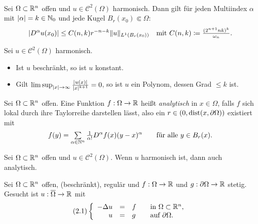 \documentclass{cheat-sheet}
\newcommand{\dist}{\mathrm{dist}} %
\begin{document}
\begin{satz}\mbox{}\\
  Sei $\Omega \subset \mathbb{R}^n$ offen und $u \in \mathcal{C}^2(\Omega)$ harmonisch. Dann gilt für jeden Multiindex $\alpha$ mit $\lvert\alpha\rvert = k \in \mathbb{N}_0$ und jede Kugel $B_r(x_0) \Subset \Omega$:
  \[
    \lvert D^\alpha u(x_0)\rvert \leq C(n, k) r^{-n-k} \lVert u\rVert_{L^1(B_r(x_0))}
    \quad \text{mit } C(n, k) \coloneqq \tfrac{(2^{n+1} nk)^k}{\omega_n}.
  \]
\end{satz}

\begin{satz}[Liouville]
  Sei $u \in \mathcal{C}^2(\Omega)$ harmonisch.
  \begin{itemize}
    \item Ist $u$ beschränkt, so ist $u$ konstant.
    \item Gilt $\limsup_{\lvert x\rvert \to \infty} \tfrac{\lvert u(x)\rvert}{\lvert x\rvert^{k+1}} = 0$, so ist $u$ ein Polynom, dessen Grad $\leq k$ ist.
  \end{itemize}
\end{satz}

\begin{defn}
  Sei $\Omega \subset \mathbb{R}^n$ offen. Eine Funktion $f : \Omega \to \mathbb{R}$ heißt \emph{analytisch} in $x \in \Omega$, falls $f$ sich lokal durch ihre Taylorreihe darstellen lässt, also ein $r \in \ointerval{0}{\dist(x, \partial \Omega)}$ existiert mit
  \[
    f(y) = \sum_{\alpha \in \N^n} \tfrac{1}{\alpha!} D^\alpha f(x) (y-x)^\alpha
    \qquad \text{für alle $y \in B_r(x)$.}
  \]
\end{defn}

\begin{satz}
  Sei $\Omega \subset \mathbb{R}^n$ offen und $u \in \mathcal{C}^2(\Omega)$. Wenn $u$ harmonisch ist, dann auch analytisch.
\end{satz}


\begin{prob}
  Sei $\Omega \subset \mathbb{R}^n$ offen, (beschränkt), regulär und $f : \Omega \to \mathbb{R}$ und $g : \partial \Omega \to \mathbb{R}$ stetig. Gesucht ist $u : \overline{\Omega} \to \mathbb{R}$ mit
  \[
    (2.1) \left\{ \begin{array}{rlll}
      - \Delta u &=& f &\quad \text{in $\Omega \subset \mathbb{R}^n$,}\\
      u &=& g &\quad \text{auf $\partial \Omega$.}
    \end{array} \right.
  \]
\end{prob}
\end{document}
